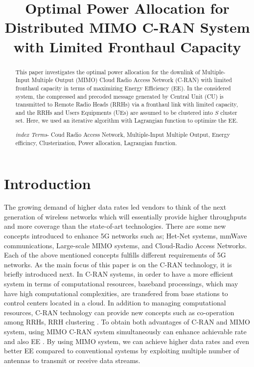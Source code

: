 \documentclass[conference,10pt,twocolumn,letter]{IEEEtran}
\begin{document}
\title{Optimal Power Allocation for Distributed MIMO C-RAN System with Limited Fronthaul Capacity} \author{
    \vspace{-.75cm}
    }
\maketitle
\begin{abstract}
This paper investigates the optimal power allocation for the downlink of Multiple-Input Multiple Output (MIMO) Cloud Radio Access Network (C-RAN) with limited fronthaul capacity in terms of maximizing Energy Efficiency (EE). 
In the considered system, the compressed and precoded message generated by Central Unit (CU) is transmitted to Remote Radio Heads (RRHs) via a fronthaul link with limited capacity, and the RRHs and Users Equipments (UEs) are assumed to be clustered into $S$ cluster set.
Here, we used an iterative algorithm with Lagrangian function to optimize the EE.


 \emph{index Terms}- Coud Radio Access Network, Multiple-Input Multiple Output, Energy efficincy, Clusterization, Power allocation, Lagrangian function.
\end{abstract}
\IEEEpeerreviewmaketitle
\section{Introduction}
The growing demand of higher data rates led vendors to think of the next generation of wireless networks which will essentially provide higher throughputs and more coverage than the state-of-art technologies. There are some new concepts introduced to enhance 5G networks such as; Het-Net systems, mmWave communications, Large-scale MIMO systems, and Cloud-Radio Access Networks. Each of the above mentioned concepts fulfills different requirements of 5G networks. As the main focus of this paper is on the C-RAN technology, it is briefly introduced next. In C-RAN systems, in order to have a more efficient system in terms of computational resources, baseband processings, which may have high computational complexities, are transfered from base stations to control centers located in a cloud. In addition to managing computational resources, C-RAN technology can provide new concepts such as co-operation among RRHs, RRH clustering \cite{33,55}. To obtain both advantages of C-RAN and MIMO system, using MIMO C-RAN system simultaneously can enhance achievable rate and also EE \cite{33}. By using MIMO system, we can achieve higher data rates and even better EE compared to conventional systems by exploiting multiple number of antennas to transmit or receive data streams.
\end{document}
